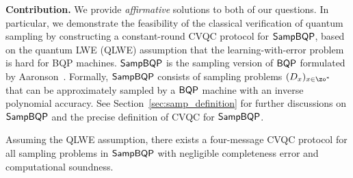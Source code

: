 







\iffalse

\vspace{2mm} \noindent \textbf{Contribution.} We provide \emph{affirmative} solutions to both of our questions.
In particular, we demonstrate the feasibility of the classical verification of quantum sampling by
constructing a constant-round CVQC protocol for $\operatorname{\mathsf{SampBQP}}$, based on the quantum LWE (QLWE) assumption that the learning-with-error problem is hard for BQP machines. 
$\operatorname{\mathsf{SampBQP}}$ is the sampling version of $\operatorname{\mathsf{BQP}}$ formulated by Aaronson~\cite{aaronson_2013}.
Formally, $\operatorname{\mathsf{SampBQP}}$ consists of sampling problems $(D_x)_{x\in\zo^*}$ that can be approximately sampled by a $\operatorname{\mathsf{BQP}}$ machine with an inverse polynomial accuracy. See Section~\ref{sec:samp_definition} for further discussions on $\operatorname{\mathsf{SampBQP}}$ and the precise definition of CVQC for $\operatorname{\mathsf{SampBQP}}$.   \begin{theorem}[informal] \label{thm:qpip0-informal}
Assuming the QLWE assumption, there exists a four-message CVQC protocol for all sampling problems in $\operatorname{\mathsf{SampBQP}}$ with negligible completeness error and computational soundness.
\end{theorem}

